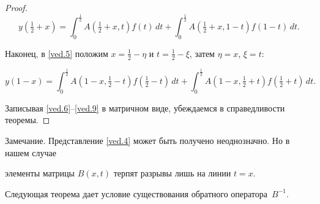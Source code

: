\begin{proof}
\begin{equation}
\label{ved.9}

y(\tfrac12+x)=

\int _{0}^{\frac12}A(\tfrac12+x,t)f(t)\,dt+

\int _{0}^{\frac12}A(\tfrac12+x,1-t)f(1-t)\,dt.

\end{equation}



Наконец, в \eqref{ved.5} положим $x=\frac12-\eta$ и $t=\frac12-\xi$, затем $\eta=x$, $\xi=t$:

\begin{equation}

\label{ved.9}

y(1-x)=

\int _{0}^{\frac12} A(1-x,\tfrac12-t) f(\tfrac12-t)\,dt+ 

\int _{0}^{\frac12} A(1-x,\tfrac12+t) f(\tfrac12+t)\,dt .

\end{equation}



Записывая \eqref{ved.6}--\eqref{ved.9} в матричном виде, убеждаемся в справедливости теоремы. 

\end{proof}



\smallskip

 

{\small\sc Замечание.}  Представление \eqref{ved.4}  может быть получено неоднозначно. Но в нашем случае

элементы матрицы  $B(x,t)$ терпят разрывы лишь на линии $t=x$.



\smallskip







Следующая теорема дает условие существования обратного оператора~$B^{-1}$.



\smallskip



